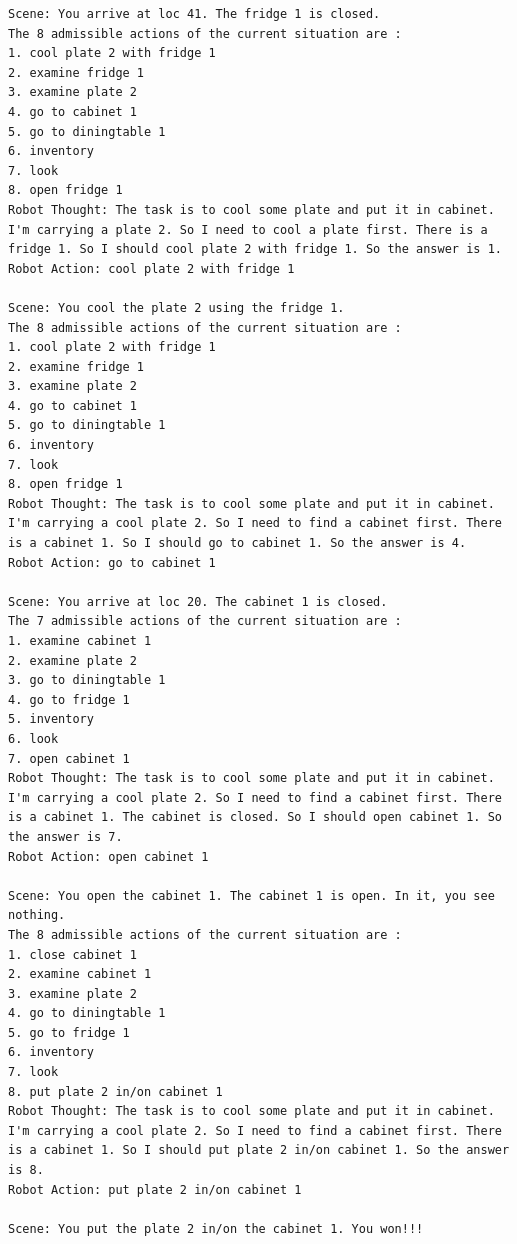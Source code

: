 \begin{lstlisting}
Scene: You arrive at loc 41. The fridge 1 is closed.
The 8 admissible actions of the current situation are :
1. cool plate 2 with fridge 1
2. examine fridge 1
3. examine plate 2
4. go to cabinet 1
5. go to diningtable 1
6. inventory
7. look
8. open fridge 1
Robot Thought: The task is to cool some plate and put it in cabinet. I'm carrying a plate 2. So I need to cool a plate first. There is a fridge 1. So I should cool plate 2 with fridge 1. So the answer is 1.
Robot Action: cool plate 2 with fridge 1

Scene: You cool the plate 2 using the fridge 1.
The 8 admissible actions of the current situation are :
1. cool plate 2 with fridge 1
2. examine fridge 1
3. examine plate 2
4. go to cabinet 1
5. go to diningtable 1
6. inventory
7. look
8. open fridge 1
Robot Thought: The task is to cool some plate and put it in cabinet. I'm carrying a cool plate 2. So I need to find a cabinet first. There is a cabinet 1. So I should go to cabinet 1. So the answer is 4.
Robot Action: go to cabinet 1

Scene: You arrive at loc 20. The cabinet 1 is closed.
The 7 admissible actions of the current situation are :
1. examine cabinet 1
2. examine plate 2
3. go to diningtable 1
4. go to fridge 1
5. inventory
6. look
7. open cabinet 1
Robot Thought: The task is to cool some plate and put it in cabinet. I'm carrying a cool plate 2. So I need to find a cabinet first. There is a cabinet 1. The cabinet is closed. So I should open cabinet 1. So the answer is 7.
Robot Action: open cabinet 1

Scene: You open the cabinet 1. The cabinet 1 is open. In it, you see nothing.
The 8 admissible actions of the current situation are :
1. close cabinet 1
2. examine cabinet 1
3. examine plate 2
4. go to diningtable 1
5. go to fridge 1
6. inventory
7. look
8. put plate 2 in/on cabinet 1
Robot Thought: The task is to cool some plate and put it in cabinet. I'm carrying a cool plate 2. So I need to find a cabinet first. There is a cabinet 1. So I should put plate 2 in/on cabinet 1. So the answer is 8.
Robot Action: put plate 2 in/on cabinet 1

Scene: You put the plate 2 in/on the cabinet 1. You won!!!
\end{lstlisting}

